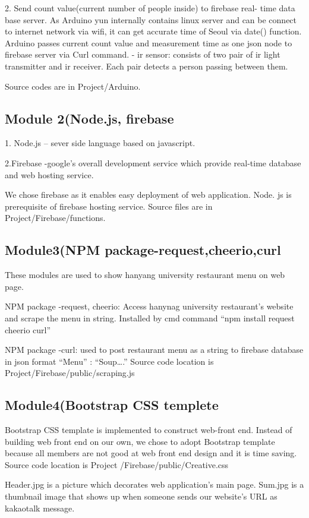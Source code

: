 \documentclass[journal]{IEEEtran}
\begin{document}
2. Send count value(current number of people inside) to firebase real- time data base server.
 As Arduino yun internally contains linux server and can be connect to internet network via wifi, it can get accurate time of Seoul via date() function. Arduino passes current count value and measurement time as one json node to firebase server via Curl command.
- ir sensor: consists of two pair of ir light transmitter and ir receiver. Each pair detects a person passing between them.

Source codes are in  Project/Arduino.

\subsection{Module 2(Node.js, firebase}
1. Node.js – sever side language based on javascript.
 
2.Firebase -google’s overall development service which provide real-time database and web hosting service.
 
We chose firebase as it enables easy deployment of web application. Node. js is prerequisite of firebase hosting service. Source files are in Project/Firebase/functions. 

\subsection{Module3(NPM package-request,cheerio,curl}
These modules are used to show hanyang university restaurant menu on web page.

NPM package -request, cheerio: Access hanynag university restaurant’s website and scrape the menu in string. Installed by cmd command “npm install request cheerio curl”

NPM package -curl: used to post restaurant menu as a string to firebase database in json format {“Menu”  : “Soup….” }
Source code location is Project/Firebase/public/scraping.js

\subsection{Module4(Bootstrap CSS templete}
Bootstrap CSS template is implemented to construct web-front end. Instead of building web front end on our own, we chose to adopt Bootstrap template because all members are not good at web front end design and it is time saving. 
Source code location is Project /Firebase/public/Creative.css

Header.jpg is a picture which decorates web application’s main page. Sum.jpg is a thumbnail image that shows up when someone sends our website’s URL as kakaotalk message.
\end{document}
